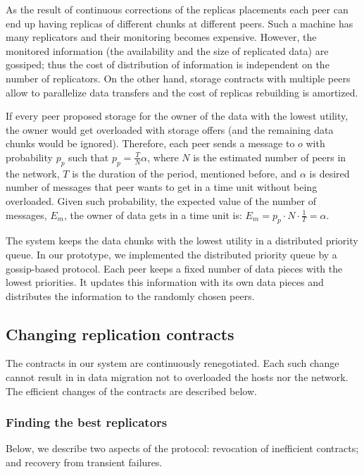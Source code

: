 \documentclass[10pt, final, conference, letterpaper]{IEEEtran}
\begin{document}
As the result of continuous corrections of the replicas placements each peer can end up having replicas of different chunks at different peers. Such a machine has many replicators and their monitoring becomes expensive. However, the monitored information (the availability and the size of replicated data) are gossiped; thus the cost of distribution of information is independent on the number of replicators. On the other hand, storage contracts with multiple peers allow to parallelize data transfers and the cost of replicas rebuilding is amortized.

If every peer proposed storage for the owner of the data with the lowest utility, the owner would get overloaded with storage offers (and the remaining data chunks would be ignored).
Therefore, each peer sends a message to $o$ with probability $p_{p}$ such that $p_{p} = \frac{T}{N} \alpha$, where $N$ is the estimated number of peers in the network, $T$ is the duration of the period, mentioned before, and $\alpha$ is desired number of messages that peer wants to get in a time unit without being overloaded. 
Given such probability, the expected value of the number of messages, $E_{m}$, the owner of data gets in a time unit is: $E_{m} = p_{p} \cdot N \cdot \frac{1}{T} = \alpha$.

The system keeps the data chunks with the lowest utility in a distributed priority queue. 
In our prototype, we implemented the distributed priority queue by a gossip-based protocol. Each peer keeps a fixed number of data pieces with the lowest priorities. It updates this information with its own data pieces and distributes the information to the randomly chosen peers.

\subsection{Changing replication contracts}

The contracts in our system are continuously renegotiated. Each such change cannot result in in data migration not to overloaded the hosts nor the network. The efficient changes of the contracts are described below.

\subsubsection{Finding the best replicators}

Below, we describe two aspects of the protocol: revocation of inefficient contracts; and recovery from transient failures.
\end{document}
